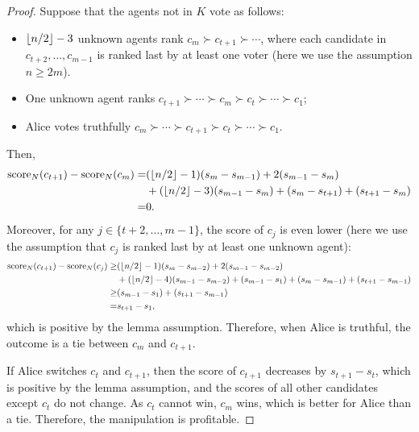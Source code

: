 \begin{proof}
Suppose that the agents not in $K$ vote as follows:
\begin{itemize}
\item $\left\lfloor n/2 \right\rfloor-3$ unknown agents rank $c_m\succ c_{t+1}\succ \cdots $,
where each candidate in $c_{t+2},\ldots,c_{m-1}$ is ranked last by at least one voter (here we use the assumption $n\geq 2m$).
\item One unknown agent ranks 
$c_{t+1}\succ \cdots \succ c_m \succ c_t \succ \cdots \succ c_1$;
\item Alice votes truthfully $c_m\succ  \cdots \succ c_{t+1} \succ  c_t \succ \cdots \succ c_1$.  
\end{itemize}
Then,
\begin{align*}
\operatorname{score}_N(c_{t+1}) - \operatorname{score}_N(c_m)
=&
(\left\lfloor n/2 \right\rfloor-1)(s_{m}-s_{m-1}) 
+ 2(s_{m-1}-s_{m})
\\
&+
(\left\lfloor n/2 \right\rfloor-3)(s_{m-1}-s_{m}) 
+ (s_m-s_{t+1})
+ (s_{t+1}-s_m)
\\
=&
0.
\end{align*}
Moreover, for any $j\in\{t+2,\ldots,m-1\}$, the score of $c_j$ is even lower (here we use the assumption that $c_j$ is ranked last by at least one unknown agent):
\begin{align*}
\operatorname{score}_N(c_{t+1}) - \operatorname{score}_N(c_j)
\geq &
(\left\lfloor n/2 \right\rfloor-1)(s_{m}-s_{m-2}) 
+ 2(s_{m-1}-s_{m-2})
\\
&+
(\left\lfloor n/2 \right\rfloor-4)(s_{m-1}-s_{m-2}) 
+ (s_{m-1}-s_1)
+ (s_m-s_{m-1})
+ (s_{t+1}-s_{m-1})
\\
\geq & (s_{m-1}-s_{1})
+ (s_{t+1}-s_{m-1})
\\
= & s_{t+1} - s_1,
\end{align*}
which is positive by the lemma assumption.
Therefore, when Alice is truthful, the outcome is a tie between $c_m$ and $c_{t+1}$.

If Alice switches $c_t$ and $c_{t+1}$, then the score of $c_{t+1}$ decreases by $s_{t+1}-s_t$, which is positive by the lemma assumption, and the scores of all other candidates except $c_t$ do not change. As $c_t$ cannot win, $c_m$ wins, which is better for Alice than a tie.
Therefore, the manipulation is profitable.
\end{proof}


